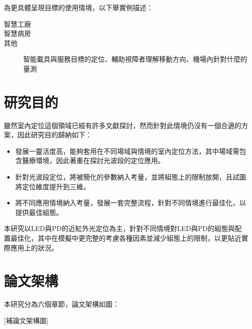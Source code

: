為更具體呈現目標的使用情境，以下舉實例描述：
\begin{description}
    \item[智慧工廠] 
    \item[智慧病房]
    \item[其他]  
    智能載具與服務目標的定位、輔助視障者理解移動方向、機場內針對什麼的量測 
\end{description}







\section{研究目的}

雖然室內定位這個領域已經有許多文獻探討，然而針對此情境仍沒有一個合適的方案，因此研究目的歸納如下：


\begin{itemize} 
    \item 發展一靈活度高，能夠套用在不同場域與情境的室內定位方法，其中場域需包含醫療環境，因此著重在探討光波段的定位應用。  
    \item 針對光波段定位，將被簡化的參數納入考量，並將組態上的限制放開，且試圖將定位維度提升到三維。
    \item 將不同應用情境納入考量，發展一套完整流程，針對不同情境進行最佳化，以提供最佳組態。
\end{itemize}

本研究以LED與PD的近紅外光定位為主，針對不同情境對LED與PD的組態與配置最佳化，其中在模擬中更完整的考慮各種因素並減少組態上的限制，以更貼近實際應用上的狀況。






\section{論文架構}
本研究分為六個章節，論文架構如圖：

[補論文架構圖]

